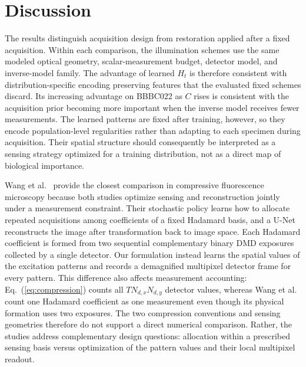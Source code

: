 \documentclass{optica-article}
\begin{document}
\FloatBarrier

\section{Discussion}
\label{sec:discussion}

The results distinguish acquisition design from restoration applied after a fixed acquisition. Within each comparison, the illumination schemes use the same modeled optical geometry, scalar-measurement budget, detector model, and inverse-model family. The advantage of learned $H_t$ is therefore consistent with distribution-specific encoding preserving features that the evaluated fixed schemes discard. Its increasing advantage on BBBC022 as $C$ rises is consistent with the acquisition prior becoming more important when the inverse model receives fewer measurements. The learned patterns are fixed after training, however, so they encode population-level regularities rather than adapting to each specimen during acquisition. Their spatial structure should consequently be interpreted as a sensing strategy optimized for a training distribution, not as a direct map of biological importance.

Wang et al.~\cite{wang2021joint} provide the closest comparison in compressive fluorescence microscopy because both studies optimize sensing and reconstruction jointly under a measurement constraint. Their stochastic policy learns how to allocate repeated acquisitions among coefficients of a fixed Hadamard basis, and a U-Net reconstructs the image after transformation back to image space. Each Hadamard coefficient is formed from two sequential complementary binary DMD exposures collected by a single detector. Our formulation instead learns the spatial values of the excitation patterns and records a demagnified multipixel detector frame for every pattern. This difference also affects measurement accounting: Eq.~(\ref{eq:compression}) counts all $T N_{d,x}N_{d,y}$ detector values, whereas Wang et al. count one Hadamard coefficient as one measurement even though its physical formation uses two exposures. The two compression conventions and sensing geometries therefore do not support a direct numerical comparison. Rather, the studies address complementary design questions: allocation within a prescribed sensing basis versus optimization of the pattern values and their local multipixel readout.
\end{document}
